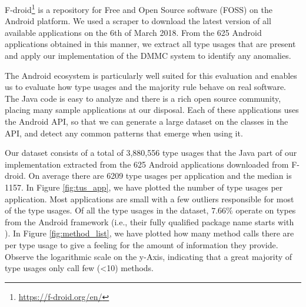 F-droid\footnote{\url{https://f-droid.org/en/}} is a repository for Free and Open Source software (FOSS) on the Android platform.
We used a scraper to download the latest version of all available applications on the 6th of March 2018.
From the 625 Android applications obtained in this manner, we extract all type usages that are present and apply our implementation of the $\text{DMMC}$ system to identify any anomalies.

The Android ecosystem is particularly well suited for this evaluation and enables us to evaluate how type usages and the majority rule behave on real software.
The Java code is easy to analyze and there is a rich open source community, placing many sample applications at our disposal.
Each of these applications uses the Android API, so that we can generate a large dataset on the classes in the API, and detect any common patterns that emerge when using it.

Our dataset consists of a total of 3,880,556 type usages that the Java part of our implementation extracted from the 625 Android applications downloaded from F-droid.
On average there are 6209 type usages per application and the median is 1157.
In Figure \ref{fig:tus_app}, we have plotted the number of type usages per application.
Most applications are small with a few outliers responsible for most of the type usages.
Of all the type usages in the dataset, $7.66\%$ operate on types from the Android framework (i.e., their fully qualified package name starts with ).
In Figure \ref{fig:method_list}, we have plotted how many method calls there are per type usage to give a feeling for the amount of information they provide.
Observe the logarithmic scale on the y-Axis, indicating that a great majority of type usages only call few (<10) methods.

